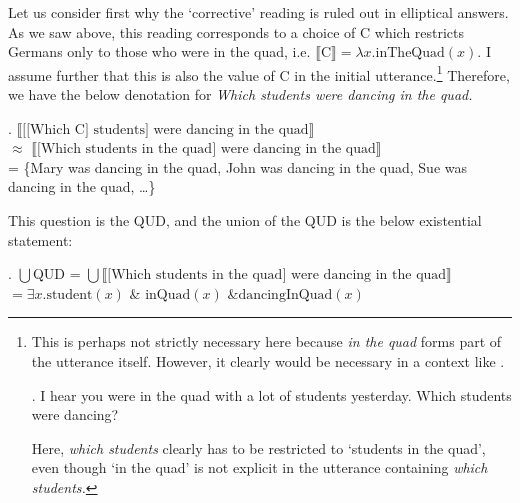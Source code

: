 \documentclass[doublespace]{umthesis}
\newcommand{\ext}[1]{\ensuremath{\llbracket \textrm{{#1}} \rrbracket}}
\newcommand{\pred}[1]{\ensuremath{\mathrm{{#1}}}}
\begin{document}
Let us consider first why the `corrective' reading is ruled out in elliptical answers.
As we saw above, this reading corresponds to a choice of C which restricts Germans only to those who were in the quad, i.e. $\ext{C} = \lambda x. \pred{inTheQuad}(x)$.
I assume further that this is also the value of C in the initial utterance.\footnote{This is perhaps not strictly necessary here because {\it in the quad} forms part of the utterance itself.
However, it clearly would be necessary in a context like \Next.

\ex. 	I hear you were in the quad with a lot of students yesterday.
	Which students were dancing?
	
Here, {\it which students} clearly has to be restricted to `students in the quad', even though `in the quad' is not explicit in the utterance containing {\it which students.}}
Therefore, we have the below denotation for \it{Which students were dancing in the quad}.

\ex. 	\ext{[[Which C] students] were dancing in the quad}\\
	$\approx$ \ext{[Which students in the quad] were dancing in the quad}\\
	= \{Mary was dancing in the quad, John was dancing in the quad, Sue was dancing in the quad, \ldots\}
	
This question is the QUD, and the union of the QUD is the below existential statement:

\ex.	$\bigcup$QUD = $\bigcup$\ext{[Which students in the quad] were dancing in the quad}\\
	$= \exists x. \pred{student}(x) $ \& $\pred{inQuad}(x)$ \&$ \pred{dancingInQuad}(x)$
	
\end{document}
